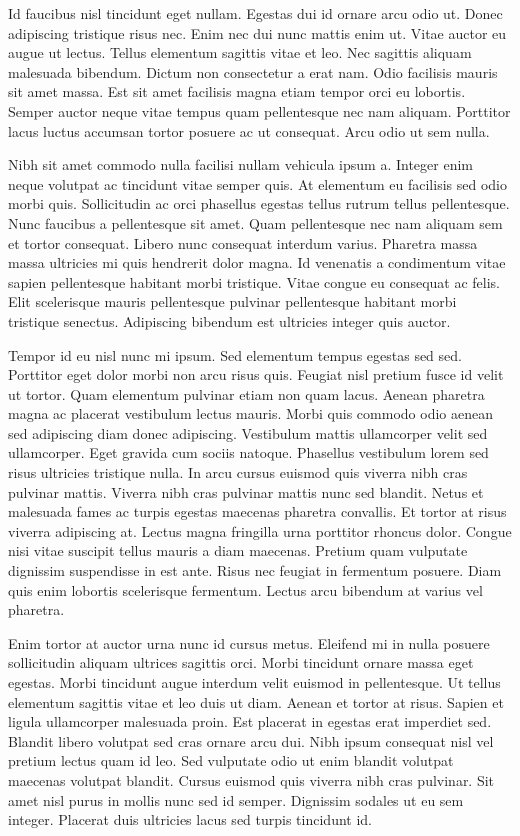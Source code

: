 \documentclass[11pt,a4paper]{article}
\begin{document}
Id faucibus nisl tincidunt eget nullam. Egestas dui id ornare arcu odio ut. Donec adipiscing tristique risus nec. Enim nec dui nunc mattis enim ut. Vitae auctor eu augue ut lectus. Tellus elementum sagittis vitae et leo. Nec sagittis aliquam malesuada bibendum. Dictum non consectetur a erat nam. Odio facilisis mauris sit amet massa. Est sit amet facilisis magna etiam tempor orci eu lobortis. Semper auctor neque vitae tempus quam pellentesque nec nam aliquam. Porttitor lacus luctus accumsan tortor posuere ac ut consequat. Arcu odio ut sem nulla.

Nibh sit amet commodo nulla facilisi nullam vehicula ipsum a. Integer enim neque volutpat ac tincidunt vitae semper quis. At elementum eu facilisis sed odio morbi quis. Sollicitudin ac orci phasellus egestas tellus rutrum tellus pellentesque. Nunc faucibus a pellentesque sit amet. Quam pellentesque nec nam aliquam sem et tortor consequat. Libero nunc consequat interdum varius. Pharetra massa massa ultricies mi quis hendrerit dolor magna. Id venenatis a condimentum vitae sapien pellentesque habitant morbi tristique. Vitae congue eu consequat ac felis. Elit scelerisque mauris pellentesque pulvinar pellentesque habitant morbi tristique senectus. Adipiscing bibendum est ultricies integer quis auctor.

Tempor id eu nisl nunc mi ipsum. Sed elementum tempus egestas sed sed. Porttitor eget dolor morbi non arcu risus quis. Feugiat nisl pretium fusce id velit ut tortor. Quam elementum pulvinar etiam non quam lacus. Aenean pharetra magna ac placerat vestibulum lectus mauris. Morbi quis commodo odio aenean sed adipiscing diam donec adipiscing. Vestibulum mattis ullamcorper velit sed ullamcorper. Eget gravida cum sociis natoque. Phasellus vestibulum lorem sed risus ultricies tristique nulla. In arcu cursus euismod quis viverra nibh cras pulvinar mattis. Viverra nibh cras pulvinar mattis nunc sed blandit. Netus et malesuada fames ac turpis egestas maecenas pharetra convallis. Et tortor at risus viverra adipiscing at. Lectus magna fringilla urna porttitor rhoncus dolor. Congue nisi vitae suscipit tellus mauris a diam maecenas. Pretium quam vulputate dignissim suspendisse in est ante. Risus nec feugiat in fermentum posuere. Diam quis enim lobortis scelerisque fermentum. Lectus arcu bibendum at varius vel pharetra.

Enim tortor at auctor urna nunc id cursus metus. Eleifend mi in nulla posuere sollicitudin aliquam ultrices sagittis orci. Morbi tincidunt ornare massa eget egestas. Morbi tincidunt augue interdum velit euismod in pellentesque. Ut tellus elementum sagittis vitae et leo duis ut diam. Aenean et tortor at risus. Sapien et ligula ullamcorper malesuada proin. Est placerat in egestas erat imperdiet sed. Blandit libero volutpat sed cras ornare arcu dui. Nibh ipsum consequat nisl vel pretium lectus quam id leo. Sed vulputate odio ut enim blandit volutpat maecenas volutpat blandit. Cursus euismod quis viverra nibh cras pulvinar. Sit amet nisl purus in mollis nunc sed id semper. Dignissim sodales ut eu sem integer. Placerat duis ultricies lacus sed turpis tincidunt id.
\end{document}
